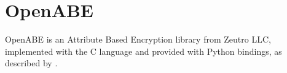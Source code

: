 \section{OpenABE}
\label{sec:bkgr_openabe}

OpenABE is an Attribute Based Encryption library from Zeutro LLC, implemented with the C language and provided with Python bindings, as described by \citet{Akinyele2011}.
